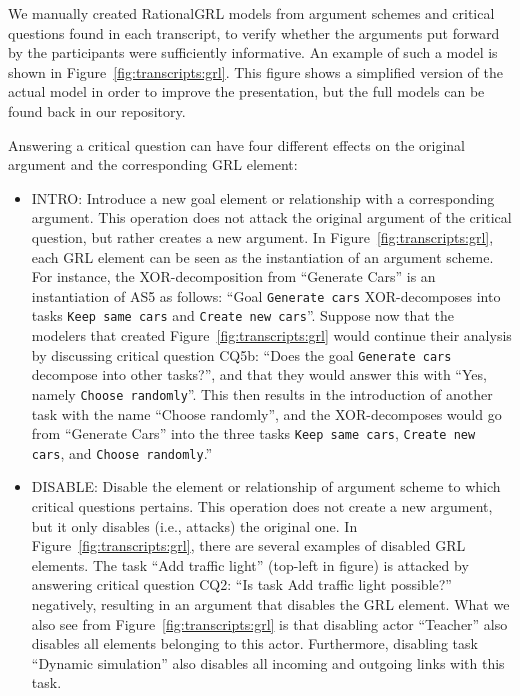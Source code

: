 We manually created RationalGRL models from argument schemes and critical questions found in each transcript, to verify whether the arguments put forward by the participants were sufficiently informative. An example of such a model is shown in Figure~\ref{fig:transcripts:grl}. This figure shows a simplified version of the actual model in order to improve the presentation, but the full models can be found back in our repository. 

Answering a critical question can have four different effects on the original argument and the corresponding GRL element:
\begin{itemize} 
\item \textsf{INTRO}: Introduce a new goal element or relationship with a corresponding argument. This operation does not attack the original argument of the critical question, but rather creates a new argument. In Figure~\ref{fig:transcripts:grl}, each GRL element can be seen as the instantiation of an argument scheme. For instance, the XOR-decomposition from ``Generate Cars'' is an instantiation of AS5 as follows: ``Goal \texttt{Generate cars} XOR-decomposes into tasks \texttt{Keep same cars} and \texttt{Create new cars}''. Suppose now that the modelers that created Figure~\ref{fig:transcripts:grl} would continue their analysis by discussing critical question CQ5b: ``Does the goal \texttt{Generate cars} decompose into other tasks?'', and that they would answer this with ``Yes, namely \texttt{Choose randomly}''. This then results in the introduction of another task with the name ``Choose randomly'', and the XOR-decomposes would go from ``Generate Cars'' into the three tasks \texttt{Keep same cars}, \texttt{Create new cars}, and \texttt{Choose randomly}.''
\item \textsf{DISABLE:} Disable the element or relationship of argument scheme to which critical questions pertains. This operation does not create a new argument, but it only disables (i.e., attacks) the original one. In Figure~\ref{fig:transcripts:grl}, there are several examples of disabled GRL elements. The task ``Add traffic light'' (top-left in figure) is attacked by answering critical question CQ2: ``Is task Add traffic light possible?'' negatively, resulting in an argument that disables the GRL element. What we also see from Figure~\ref{fig:transcripts:grl} is that disabling actor ``Teacher'' also disables all elements belonging to this actor. Furthermore, disabling task ``Dynamic simulation'' also disables all incoming and outgoing links with this task.


\end{itemize}
